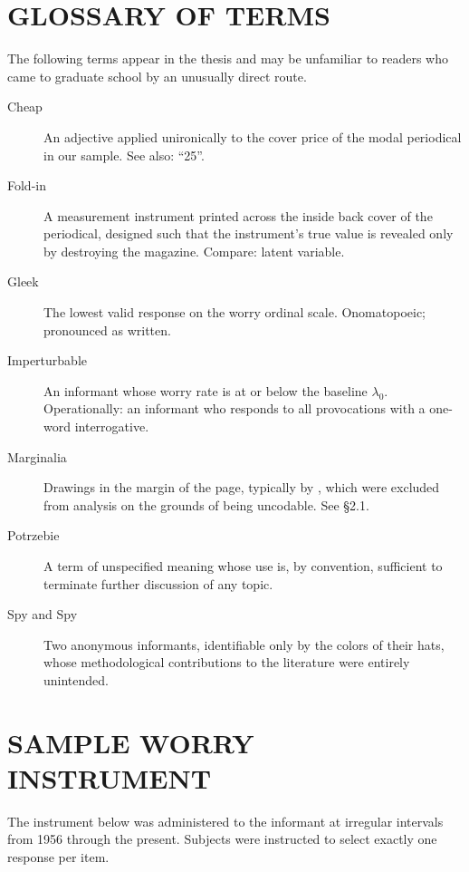 \documentclass{cpthesis}
\begin{document}
\appendixtocformat
{}
\newpage
\begin{appendices}

\chapter{GLOSSARY OF TERMS}

The following terms appear in the thesis and may be unfamiliar to
readers who came to graduate school by an unusually direct route.

\begin{description}
    \item[Cheap] An adjective applied unironically to the cover price
        of the modal periodical in our sample. See also: ``25\textcent''.
    \item[Fold-in] A measurement instrument printed across the inside
        back cover of the periodical, designed such that the
        instrument's true value is revealed only by destroying the
        magazine. Compare: latent variable.
    \item[Gleek] The lowest valid response on the worry ordinal scale.
        Onomatopoeic; pronounced as written.
    \item[Imperturbable] An informant whose worry rate is at or below
        the baseline $\lambda_0$. Operationally: an informant who
        responds to all provocations with a one-word interrogative.
    \item[Marginalia] Drawings in the margin of the page, typically by
        \citet{aragones2007marginal}, which were excluded from
        analysis on the grounds of being uncodable. See \S2.1.
    \item[Potrzebie] A term of unspecified meaning whose use is, by
        convention, sufficient to terminate further discussion of
        any topic.
    \item[Spy and Spy] Two anonymous informants, identifiable only by
        the colors of their hats, whose methodological contributions
        to the literature were entirely unintended.
\end{description}

\chapter{SAMPLE WORRY INSTRUMENT}

The instrument below was administered to the informant at irregular
intervals from 1956 through the present. Subjects were instructed to
select exactly one response per item.


\end{appendices}
\end{document}
